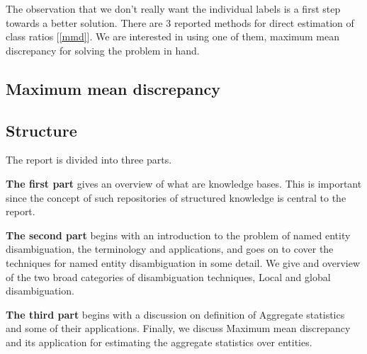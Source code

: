 The observation that we don't really want the individual labels is a first step towards a better solution. 
There are 3 reported methods for direct estimation of class ratios [\ref{mmd}]. We are interested in 
using one of them, maximum mean discrepancy for solving the problem in hand.

\subsection{Maximum mean discrepancy}
  

\subsection{Structure}
The report is divided into three parts.

\textbf{The first part} gives an overview of what are knowledge bases. This is important 
since the concept of such repositories of structured knowledge is central to the
report. 

\textbf{The second part} begins with an introduction to the problem of named entity disambiguation, the 
terminology and applications, and goes on to cover the techniques for named entity disambiguation
in some detail. We give and overview of the two broad categories of disambiguation techniques, Local and
global disambiguation.

\textbf{The third part} begins with a discussion on definition of Aggregate statistics and 
some of their applications. Finally, we discuss Maximum mean discrepancy and its 
application for estimating the aggregate statistics over entities.

